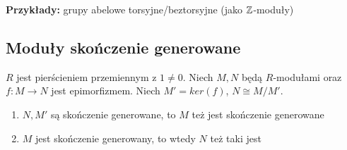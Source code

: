 \textbf{Przykłady:} grupy abelowe torsyjne/beztorsyjne (jako $\mathbb{Z}$-moduły)

\subsection{Moduły skończenie generowane}

\begin{theorem}
  $R$ jest pierścieniem przemiennym z $1\neq 0$. Niech $M,N$ będą $R$-modułami oraz $f:M\to N$ jest epimorfizmem. Niech $M'=ker(f)$, $N\cong M/M'$.

  \begin{enumerate}
    \item $N,M'$ są skończenie generowane, to $M$ też jest skończenie generowane
    \item $M$ jest skończenie generowany, to wtedy $N$ też taki jest
  \end{enumerate}
\end{theorem}
